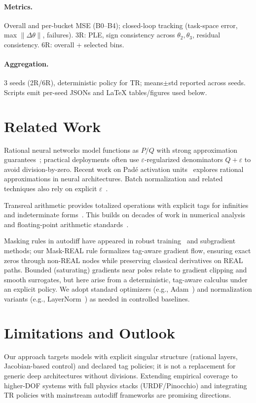 \documentclass[twoside,11pt]{article}
\newcommand{\trReal}{\textsc{REAL}}
\newcommand{\TAGREAL}{\trReal}
\begin{document}
\paragraph{Metrics.} Overall and per-bucket MSE (B0--B4); closed-loop tracking (task-space error, max $\|\Delta\theta\|$, failures). 3R: PLE, sign consistency across $\theta_2,\theta_3$, residual consistency. 6R: overall + selected bins.
\paragraph{Aggregation.} 3 seeds (2R/6R), deterministic policy for TR; means$\pm$std reported across seeds. Scripts emit per-seed JSONs and LaTeX tables/figures used below.

\section*{Related Work}
Rational neural networks model functions as $P/Q$ with strong approximation guarantees~\citep{boulle2020rational,telgarsky2017neural}; practical deployments often use $\varepsilon$-regularized denominators $Q+\varepsilon$ to avoid division-by-zero. Recent work on Padé activation units~\citep{montanher2020pade,molina2020pade} explores rational approximations in neural architectures. Batch normalization and related techniques also rely on explicit $\varepsilon$~\citep{ioffe2015batchnorm}. 

Transreal arithmetic provides totalized operations with explicit tags for infinities and indeterminate forms~\citep{reis2016transreal,anderson2019transmathematics,anderson2006perspex}. This builds on decades of work in numerical analysis~\citep{higham2002accuracy,muller2010handbook} and floating-point arithmetic standards~\citep{ieee754-2019,goldberg1991every}.

Masking rules in autodiff have appeared in robust training~\citep{pascanu2013difficulty} and subgradient methods; our Mask-REAL rule formalizes tag-aware gradient flow, ensuring exact zeros through non-\TAGREAL{} nodes while preserving classical derivatives on \TAGREAL{} paths. Bounded (saturating) gradients near poles relate to gradient clipping and smooth surrogates, but here arise from a deterministic, tag-aware calculus under an explicit policy. We adopt standard optimizers (e.g., Adam~\citep{kingma2015adam}) and normalization variants (e.g., LayerNorm~\citep{ba2016layernorm}) as needed in controlled baselines.

\section*{Limitations and Outlook}
Our approach targets models with explicit singular structure (rational layers, Jacobian-based control) and declared tag policies; it is not a replacement for generic deep architectures without divisions. Extending empirical coverage to higher-DOF systems with full physics stacks (URDF/Pinocchio) and integrating TR policies with mainstream autodiff frameworks are promising directions.
\end{document}
